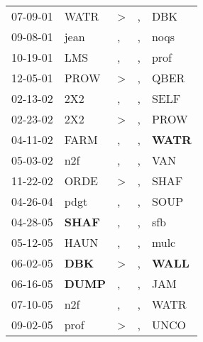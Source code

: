 \begin{supertabular}{p{0.07\textwidth}p{0.06\textwidth}p{0.02\textwidth}p{0.02\textwidth}p{0.06\textwidth}}
 07-09-01\textsuperscript{} &           WATR\textsuperscript{} &  \textgreater &             , &            DBK\textsuperscript{} \\
 09-08-01\textsuperscript{} &           jean\textsuperscript{} &             , &             , &           noqs\textsuperscript{} \\
 10-19-01\textsuperscript{} &            LMS\textsuperscript{} &             , &             , &           prof\textsuperscript{} \\
 12-05-01\textsuperscript{} &           PROW\textsuperscript{} &  \textgreater &             , &           QBER\textsuperscript{} \\
 02-13-02\textsuperscript{} &            2X2\textsuperscript{} &             , &             , &           SELF\textsuperscript{} \\
 02-23-02\textsuperscript{} &            2X2\textsuperscript{} &  \textgreater &             , &           PROW\textsuperscript{} \\
 04-11-02\textsuperscript{} &           FARM\textsuperscript{} &             , &             , &  \textbf{WATR\textsuperscript{}} \\
 05-03-02\textsuperscript{} &            n2f\textsuperscript{} &             , &             , &            VAN\textsuperscript{} \\
 11-22-02\textsuperscript{} &           ORDE\textsuperscript{} &  \textgreater &             , &           SHAF\textsuperscript{} \\
 04-26-04\textsuperscript{} &           pdgt\textsuperscript{} &             , &             , &           SOUP\textsuperscript{} \\
 04-28-05\textsuperscript{} &  \textbf{SHAF\textsuperscript{}} &             , &             , &            sfb\textsuperscript{} \\
 05-12-05\textsuperscript{} &           HAUN\textsuperscript{} &             , &             , &           mulc\textsuperscript{} \\
 06-02-05\textsuperscript{} &   \textbf{DBK\textsuperscript{}} &  \textgreater &             , &  \textbf{WALL\textsuperscript{}} \\
 06-16-05\textsuperscript{} &  \textbf{DUMP\textsuperscript{}} &             , &             , &            JAM\textsuperscript{} \\
 07-10-05\textsuperscript{} &            n2f\textsuperscript{} &             , &             , &           WATR\textsuperscript{} \\
 09-02-05\textsuperscript{} &           prof\textsuperscript{} &  \textgreater &             , &           UNCO\textsuperscript{} \\

\end{supertabular}
